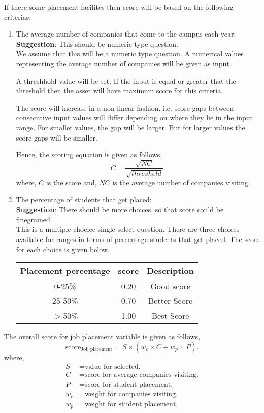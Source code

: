 \documentclass[oneside,twocolumn]{article}
\begin{document}
If there some placement facilites then score will be based on
the following criterias:
\begin{enumerate}
  \item The average number of companies that come to the
  campus each year: \\
  \textbf{Suggestion}: This should be numeric type question. \\

  We assume that this will be a numeric type question. A numerical
  values representing the average number of companies will be
  given as input.

  A threshhold value will be set. If the input is equal or greater
  that the threshold then the asset will have maximum score
  for this criteria. 

  The score will increase in a non-linear fashion. i.e. score
  gaps between consecutive input values will differ depending
  on where they lie in the input range. For smaller values, the
  gap will be larger. But for larger values the score gaps will
  be smaller.

  Hence, the scoring equation is given as follows,
  \[
	C = \dfrac{\sqrt{NC}}{\sqrt{threshold}}.
  \]
  where, \(C\) is the score and, \(NC\) is the average number of companies
  visiting.

  \item The percentage of students that get placed: \\
  \textbf{Suggestion}: There should be more choices, so that
  score could be finegrained. \\  

  This is a multiple chocice single select question. There are
  three choices available for ranges in terms of percentage
  students that get placed. The score for each choice is given
  below.
  \begin{center}
    \begin{tabular}{c | c | c} \hline
      Placement percentage & score & Description \\ \hline
      0-25\%		     & 0.20  & Good score \\
      25-50\%		     & 0.70  & Better Score \\
      \(>\)50\%	             & 1.00  & Best Score \\ \hline
    \end{tabular}
  \end{center}
  \end{enumerate}

The overall score for job placement variable is given as follows,
\[
	\text{score}_{\text{Job placement}} = S \times (w_c \times C + w_p \times P).
\]
where,
\begin{align*}
	S &= \text{value for selected.} \\
	C &= \text{score for average companies visiting.} \\
	P &= \text{score for student placement.} \\
	w_c &= \text{weight for companies visiting.} \\
	w_p &= \text{weight for student placement.} \\
\end{align*}
\end{document}
